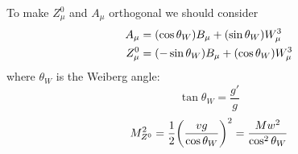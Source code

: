 \documentclass[../main/main.tex]{subfiles}
\begin{document}
To make \( Z_ \mu ^0 \) and \( A _ \mu  \) orthogonal we should consider
\begin{subequations}
\begin{align}
  A_ \mu  &=  \qty(\cos \theta _W) B _ \mu  + \qty(\sin \theta _W ) W_ \mu ^3 \\
  Z_ \mu ^0 & = \qty(- \sin \theta _W ) B _ \mu + \qty(\cos \theta _W ) W_ \mu ^3
\end{align}
\end{subequations}
where \( \theta _W \) is the Weiberg angle:
\begin{equation}
  \tan \theta _W = \frac{g'}{g}
\end{equation}
\begin{equation}
  M_ {Z^0}^2 = \frac{1}{2} \qty(\frac{vg}{\cos \theta _W})^2 = \frac{M w^2}{\cos^2 \theta _W}
\end{equation}
\end{document}
